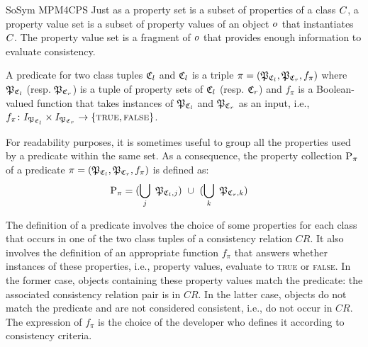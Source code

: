\begin{copiedFrom}{SoSym MPM4CPS}
Just as a property set is a subset of properties of a class $\class{C}{}$, a property value set is a subset of property values of an object $\object{o}{}$ that instantiates $\class{C}{}$. The property value set is a fragment of $\object{o}{}$ that provides enough information to evaluate consistency.

\begin{definition}[Predicate]
A predicate for two class tuples $\classtuple{C}{l}$ and $\classtuple{C}{l}$ is a triple $\pi = (\propertysettuple{P}{\classtuple{C}{l}}, \propertysettuple{P}{\classtuple{C}{r}}, f_\pi)$ where $\propertysettuple{P}{\classtuple{C}{l}}$ (resp. $\propertysettuple{P}{\classtuple{C}{r}}$) is a tuple of property sets of $\classtuple{C}{l}$ (resp. $\classtuple{C}{r}$) and $f_\pi$ is a Boolean-valued function that takes instances of $\tuple{P}_{\classtuple{C}{l}}$ and $\tuple{P}_{\classtuple{C}{r}}$ as an input, i.e., $f_\pi \colon I_{\propertysettuple{P}{\classtuple{C}{l}}} \times I_{\propertysettuple{P}{\classtuple{C}{r}}} \to \{\textsc{true}, \textsc{false}\}$.
\end{definition}

For readability purposes, it is sometimes useful to group all the properties used by a predicate within the same set. As a consequence, the property collection $\mathrm{P}_{\pi}$ of a predicate $\pi = (\propertysettuple{P}{\classtuple{C}{l}}, \propertysettuple{P}{\classtuple{C}{r}}, f_\pi)$ is defined as:
\begin{align*}
    &
    \propertycollection{\pi} = (\bigcup_{j}\ \tuple{P}_{\classtuple{C}{l}, j})\ \cup\ (\bigcup_{k}\ \tuple{P}_{\classtuple{C}{r}, k})  
\end{align*}

The definition of a predicate involves the choice of some properties for each class that occurs in one of the two class tuples of a consistency relation $CR$. It also involves the definition of an appropriate function $f_\pi$ that answers whether instances of these properties, i.e., property values, evaluate to \textsc{true} or \textsc{false}. In the former case, objects containing these property values match the predicate: the associated consistency relation pair is in $CR$. In the latter case, objects do not match the predicate and are not considered consistent, i.e., do not occur in $CR$. The expression of $f_\pi$ is the choice of the developer who defines it according to consistency criteria.


\end{copiedFrom}
